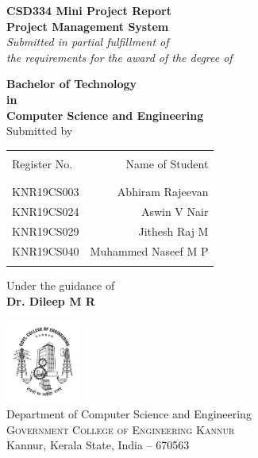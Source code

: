 \begin{titlepage}
\clearpage
\thispagestyle{empty}
\begin{center}

\textup{\large{  \bf CSD334 Mini Project Report }}\\[0.2in]

\Large \textbf {Project Management System}\\[0.5in]

       \small \emph{Submitted in partial fulfillment of\\
        the requirements for the award of the degree of}
        \vspace{.2in}

       {\bf Bachelor of Technology \\in\\ Computer Science and Engineering}\\[0.5in]

\normalsize Submitted by \\
\begin{table}[h]
\centering
\begin{tabular}{lr}\hline \\
Register No. & Name of Student \\ \\ \hline
\\
KNR19CS003  & Abhiram Rajeevan \\
KNR19CS024  & Aswin V Nair \\ 
KNR19CS029  & Jithesh Raj M  \\ 
KNR19CS040  & Muhammed Naseef M P \\ \\ \hline 
\end{tabular}
\end{table}

\vspace{.1in}
Under the guidance of\\
{\textbf{Dr. Dileep M R}}\\[0.2in]

\vfill

\includegraphics[width=0.18\textwidth]{./gcek_logo.jpg}\\[0.1in]
\Large{Department of Computer Science and Engineering}\\
\normalsize
\textsc{Government College of Engineering Kannur}\\
Kannur, Kerala State, India -- 670563 \\
\vspace{0.2cm}


\end{center}

\end{titlepage}
